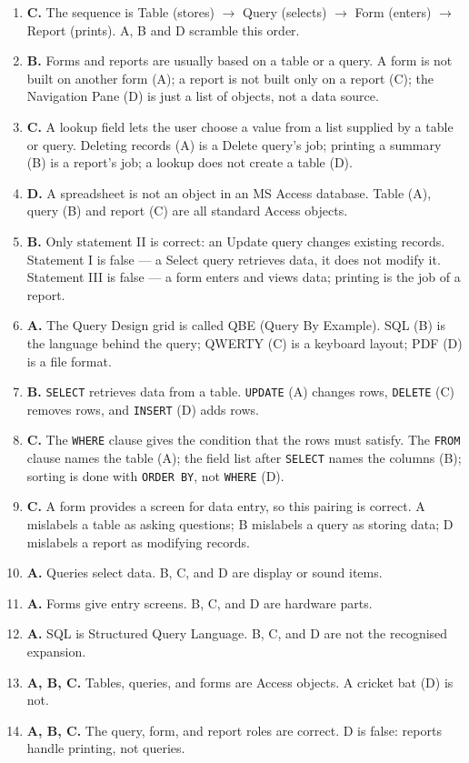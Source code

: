 \documentclass[11pt]{article}
\begin{document}
\begin{enumerate}[label=\textbf{Q\arabic*.}, leftmargin=*]
  sharing. Entering records (A) is a form's job; storing data (C) is a
  table's job; modifying records (D) is an action query's job.
\item \textbf{C.} The sequence is Table (stores) $\rightarrow$ Query
  (selects) $\rightarrow$ Form (enters) $\rightarrow$ Report (prints). A, B
  and D scramble this order.
\item \textbf{B.} Forms and reports are usually based on a table or a query.
  A form is not built on another form (A); a report is not built only on a
  report (C); the Navigation Pane (D) is just a list of objects, not a data
  source.
\item \textbf{C.} A lookup field lets the user choose a value from a list
  supplied by a table or query. Deleting records (A) is a Delete query's job;
  printing a summary (B) is a report's job; a lookup does not create a table
  (D).
\item \textbf{D.} A spreadsheet is not an object in an MS Access database.
  Table (A), query (B) and report (C) are all standard Access objects.
\item \textbf{B.} Only statement II is correct: an Update query changes
  existing records. Statement I is false --- a Select query retrieves data,
  it does not modify it. Statement III is false --- a form enters and views
  data; printing is the job of a report.
\item \textbf{A.} The Query Design grid is called QBE (Query By Example).
  SQL (B) is the language behind the query; QWERTY (C) is a keyboard layout;
  PDF (D) is a file format.
\item \textbf{B.} \texttt{SELECT} retrieves data from a table. \texttt{UPDATE}
  (A) changes rows, \texttt{DELETE} (C) removes rows, and \texttt{INSERT}
  (D) adds rows.
\item \textbf{C.} The \texttt{WHERE} clause gives the condition that the
  rows must satisfy. The \texttt{FROM} clause names the table (A); the field
  list after \texttt{SELECT} names the columns (B); sorting is done with
  \texttt{ORDER BY}, not \texttt{WHERE} (D).
\item \textbf{C.} A form provides a screen for data entry, so this pairing is
  correct. A mislabels a table as asking questions; B mislabels a query as
  storing data; D mislabels a report as modifying records.

\item \textbf{A.} Queries select data. B, C, and D are display or sound items.
\item \textbf{A.} Forms give entry screens. B, C, and D are hardware parts.
\item \textbf{A.} SQL is Structured Query Language. B, C, and D are not the recognised expansion.
\item \textbf{A, B, C.} Tables, queries, and forms are Access objects. A cricket bat (D) is not.
\item \textbf{A, B, C.} The query, form, and report roles are correct. D is false: reports handle printing, not queries.
\end{enumerate}
\def\JKSSBLessonID{30}\def\JKSSBAnswers{1}
\end{document}
